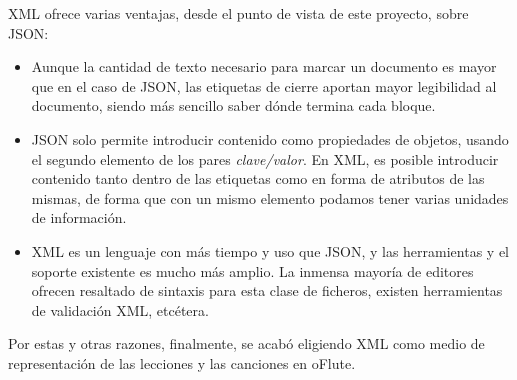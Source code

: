 XML ofrece varias ventajas, desde el punto de vista de este proyecto, sobre JSON:
\begin{itemize}
\item Aunque la cantidad de texto necesario para marcar un documento es mayor
  que en el caso de JSON, las etiquetas de cierre aportan mayor legibilidad al
  documento, siendo más sencillo saber dónde termina cada bloque.
\item JSON solo permite introducir contenido como propiedades de objetos, usando
  el segundo elemento de los pares \textit{clave/valor}. En XML, es posible
  introducir contenido tanto dentro de las etiquetas como en forma de atributos
  de las mismas, de forma que con un mismo elemento podamos tener varias
  unidades de información.
\item XML es un lenguaje con más tiempo y uso que JSON, y las herramientas y el
  soporte existente es mucho más amplio. La inmensa mayoría de editores ofrecen
  resaltado de sintaxis para esta clase de ficheros, existen herramientas de
  validación XML, etcétera.
\end{itemize}

Por estas y otras razones, finalmente, se acabó eligiendo XML como medio de
representación de las lecciones y las canciones en oFlute.


